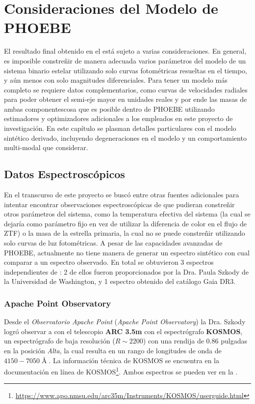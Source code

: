 \chapter{Consideraciones del Modelo de PHOEBE} \label{conclusion:consideraciones_phoebe}

El resultado final obtenido en el
 está sujeto a varias
consideraciones. En general, es imposible constreñir de manera adecuada varios
parámetros del modelo de un sistema binario estelar utilizando solo curvas
fotométricas resueltas en el tiempo, y aún menos con solo magnitudes
diferenciales. Para tener un modelo más completo se requiere datos
complementarios, como curvas de velocidades radiales para poder obtener el
semi-eje mayor en unidades reales y por ende las masas de ambas
componentes\textemdash cosa que es posible dentro de PHOEBE utilizando
estimadores y optimizadores adicionales a los empleados en este proyecto de
investigación. En este capítulo se plasman detalles particulares con el modelo
sintético derivado, incluyendo degeneraciones en el modelo y un comportamiento
multi-modal que considerar.

\section{Datos Espectroscópicos}

En el transcurso de este proyecto se buscó entre otras fuentes adicionales para
intentar encontrar observaciones espectroscópicas de \atoObjId que pudieran
constreñir otros parámetros del sistema, como la temperatura efectiva del
sistema (la cual se dejaría como parámetro fijo en vez de utilizar la diferencia
de color en el flujo de ZTF) o la masa de la estrella primaria, la cual no se
puede constreñir utilizando solo curvas de luz fotométricas. A pesar de las
capacidades avanzadas de PHOEBE, actualmente no tiene manera de generar un
espectro sintético con cual comparar a un espectro observado. En total se
obtuvieron 3 espectros independientes de \atoObjIdNoSpace : 2 de ellos fueron
proporcionados por la Dra. Paula Szkody de la Universidad de Washington, y 1
espectro obtenido del catálogo Gaia DR3.

\subsection{Apache Point Observatory}

Desde el \textit{Observatorio Apache Point} (\textit{Apache Point Observatory})
la Dra. Szkody logró observar a \atoObjId con el telescopio \textbf{ARC 3.5m}
con el espectrógrafo \textbf{KOSMOS}, un espectrógrafo de baja resolución ($R
\sim 2200$) con una rendija de 0.86 pulgadas en la posición \textit{Alta}, la
cual resulta en un rango de longitudes de onda de $4150 - 7050 \Angstrom$. La
información técnica de KOSMOS se encuentra en la documentación en línea de
KOSMOS\footnote{\url{https://www.apo.nmsu.edu/arc35m/Instruments/KOSMOS/userguide.html}}.
Ambos espectros se pueden ver en la .

